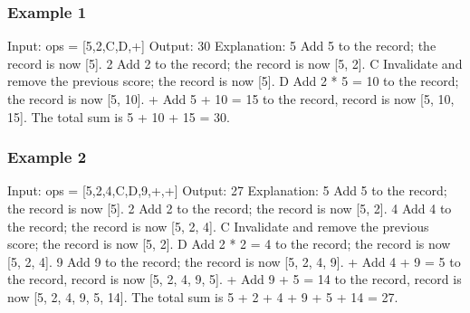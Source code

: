 \documentclass[letterpaper,12pt,english]{book}
\begin{document}
\subsubsection{Example 1}
\label{\detokenize{String/08_STR_682_Baseball_Game:example-1}}
\begin{sphinxVerbatim}[commandchars=\\\{\}]
Input: ops = [\PYGZdq{}5\PYGZdq{},\PYGZdq{}2\PYGZdq{},\PYGZdq{}C\PYGZdq{},\PYGZdq{}D\PYGZdq{},\PYGZdq{}+\PYGZdq{}]
Output: 30
Explanation:
\PYGZdq{}5\PYGZdq{} \PYGZhy{} Add 5 to the record; the record is now [5].
\PYGZdq{}2\PYGZdq{} \PYGZhy{} Add 2 to the record; the record is now [5, 2].
\PYGZdq{}C\PYGZdq{} \PYGZhy{} Invalidate and remove the previous score; the record is now [5].
\PYGZdq{}D\PYGZdq{} \PYGZhy{} Add 2 * 5 = 10 to the record; the record is now [5, 10].
\PYGZdq{}+\PYGZdq{} \PYGZhy{} Add 5 + 10 = 15 to the record, record is now [5, 10, 15].
The total sum is 5 + 10 + 15 = 30.
\end{sphinxVerbatim}


\subsubsection{Example 2}
\label{\detokenize{String/08_STR_682_Baseball_Game:example-2}}
\begin{sphinxVerbatim}[commandchars=\\\{\}]
Input: ops = [\PYGZdq{}5\PYGZdq{},\PYGZdq{}\PYGZhy{}2\PYGZdq{},\PYGZdq{}4\PYGZdq{},\PYGZdq{}C\PYGZdq{},\PYGZdq{}D\PYGZdq{},\PYGZdq{}9\PYGZdq{},\PYGZdq{}+\PYGZdq{},\PYGZdq{}+\PYGZdq{}]
Output: 27
Explanation:
\PYGZdq{}5\PYGZdq{} \PYGZhy{} Add 5 to the record; the record is now [5].
\PYGZdq{}\PYGZhy{}2\PYGZdq{} \PYGZhy{} Add \PYGZhy{}2 to the record; the record is now [5, \PYGZhy{}2].
\PYGZdq{}4\PYGZdq{} \PYGZhy{} Add 4 to the record; the record is now [5, \PYGZhy{}2, 4].
\PYGZdq{}C\PYGZdq{} \PYGZhy{} Invalidate and remove the previous score; the record is now [5, \PYGZhy{}2].
\PYGZdq{}D\PYGZdq{} \PYGZhy{} Add 2 * \PYGZhy{}2 = \PYGZhy{}4 to the record; the record is now [5, \PYGZhy{}2, \PYGZhy{}4].
\PYGZdq{}9\PYGZdq{} \PYGZhy{} Add 9 to the record; the record is now [5, \PYGZhy{}2, \PYGZhy{}4, 9].
\PYGZdq{}+\PYGZdq{} \PYGZhy{} Add \PYGZhy{}4 + 9 = 5 to the record, record is now [5, \PYGZhy{}2, \PYGZhy{}4, 9, 5].
\PYGZdq{}+\PYGZdq{} \PYGZhy{} Add 9 + 5 = 14 to the record, record is now [5, \PYGZhy{}2, \PYGZhy{}4, 9, 5, 14].
The total sum is 5 + \PYGZhy{}2 + \PYGZhy{}4 + 9 + 5 + 14 = 27.
\end{sphinxVerbatim}
\end{document}
